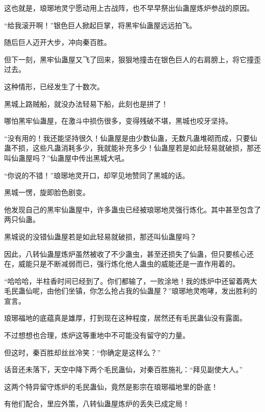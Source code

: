 \begin{this_body}
这也就是，琅琊地灵宁愿动用上古战阵，也不早早祭出仙蛊屋炼炉参战的原因。

“给我滚开啊！”银色巨人掀起巨掌，将黑牢仙蛊屋远远拍飞。

随后巨人迈开大步，冲向秦百胜。

但下一刻，黑牢仙蛊屋又飞了回来，狠狠地撞击在银色巨人的右肩膀上，将它撞歪过去。

这种情形，已经发生了十数次。

黑城上路贼船，就没办法轻易下船，此刻也是拼了！

哪怕黑牢仙蛊屋，在激斗中损伤很多，变得残破不堪，黑城也咬牙坚持。

“没有用的！我还能坚持很久！仙蛊屋是由少数仙蛊，无数凡蛊堆砌而成，只要仙蛊不损，这些凡蛊消耗多少，我就能补充多少！仙蛊屋若是如此轻易就破损，那还叫仙蛊屋吗？”仙蛊屋中传出黑城大吼。

“你说的不错！”琅琊地灵开口，却罕见地赞同了黑城的话。

黑城一愣，旋即脸色剧变。

他发现自己的黑牢仙蛊屋中，许多蛊虫已经被琅琊地灵强行炼化。其中甚至包含了两只仙蛊。

黑城说的没错仙蛊屋若是如此轻易就破损，那还叫仙蛊屋吗？

因此，八转仙蛊屋炼炉虽然被收了不少蛊虫，甚至还损失了仙蛊，但只要核心还在，威能只是不断减弱而已，强行炼化他人蛊虫的威能还是一直作用着的。

“哈哈哈，半柱香时间已经到了。你们都输了，一败涂地！我的炼炉中还留着两大毛民蛊仙呢，由他们坐镇，你怎么抢占我的仙蛊屋？”琅琊地灵咆哮，发出胜利的宣言。

琅琊福地的底蕴真是雄厚，打到现在这种程度，居然还有毛民蛊仙没有露面。

不过想想也合理，炼炉这等重地中不可能没有留守的力量。

但这时，秦百胜却丝丝冷笑：“你确定是这样么？”

话音还未落下，天空中降下两个毛民蛊仙，对秦百胜施礼：“拜见副使大人。”

这两个特异留守炼炉的毛民蛊仙，竟然是影宗在琅琊福地里的卧底！

有他们配合，里应外策，八转仙蛊屋炼炉的丢失已成定局！

\end{this_body}

